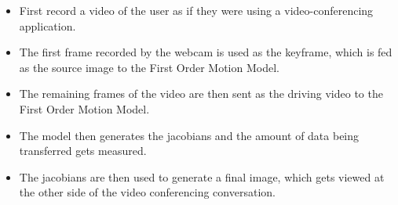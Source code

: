 \begin{itemize}
    \item First record a video of the user as if they were using a video-conferencing application. 
    \item The first frame recorded by the webcam is used as the keyframe, which is fed as the source image to the First Order Motion Model.
    \item The remaining frames of the video are then sent as the driving video to the First Order Motion Model.
    \item The model then generates the jacobians and the amount of data being transferred gets measured.
    \item The jacobians are then used to generate a final image, which gets viewed at the other side of the video conferencing conversation.
\end{itemize}